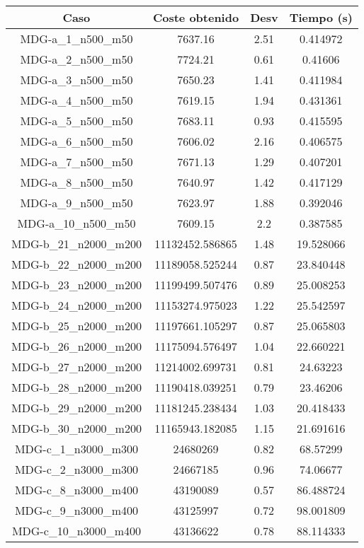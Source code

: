 \documentclass{article}
\begin{document}
\begin{table}[H]
	\centering
	\begin{tabular}{|cccc|}
		\hline
		Caso & Coste obtenido & Desv & Tiempo (s)\\ \hline
		MDG-a\_1\_n500\_m50 & 7637.16 & 2.51 & 0.414972\\
		MDG-a\_2\_n500\_m50 & 7724.21 & 0.61 & 0.41606\\
		MDG-a\_3\_n500\_m50 & 7650.23 & 1.41 & 0.411984\\
		MDG-a\_4\_n500\_m50 & 7619.15 & 1.94 & 0.431361\\
		MDG-a\_5\_n500\_m50 & 7683.11 & 0.93 & 0.415595\\
		MDG-a\_6\_n500\_m50 & 7606.02 & 2.16 & 0.406575\\
		MDG-a\_7\_n500\_m50 & 7671.13 & 1.29 & 0.407201\\
		MDG-a\_8\_n500\_m50 & 7640.97 & 1.42 & 0.417129\\
		MDG-a\_9\_n500\_m50 & 7623.97 & 1.88 & 0.392046\\
		MDG-a\_10\_n500\_m50 & 7609.15 & 2.2 & 0.387585\\
		MDG-b\_21\_n2000\_m200 & 11132452.586865 & 1.48 & 19.528066\\
		MDG-b\_22\_n2000\_m200 & 11189058.525244 & 0.87 & 23.840448\\
		MDG-b\_23\_n2000\_m200 & 11199499.507476 & 0.89 & 25.008253\\
		MDG-b\_24\_n2000\_m200 & 11153274.975023 & 1.22 & 25.542597\\
		MDG-b\_25\_n2000\_m200 & 11197661.105297 & 0.87 & 25.065803\\
		MDG-b\_26\_n2000\_m200 & 11175094.576497 & 1.04 & 22.660221\\
		MDG-b\_27\_n2000\_m200 & 11214002.699731 & 0.81 & 24.63223\\
		MDG-b\_28\_n2000\_m200 & 11190418.039251 & 0.79 & 23.46206\\
		MDG-b\_29\_n2000\_m200 & 11181245.238434 & 1.03 & 20.418433\\
		MDG-b\_30\_n2000\_m200 & 11165943.182085 & 1.15 & 21.691616\\
		MDG-c\_1\_n3000\_m300 & 24680269 & 0.82 & 68.57299\\
		MDG-c\_2\_n3000\_m300 & 24667185 & 0.96 & 74.06677\\
		MDG-c\_8\_n3000\_m400 & 43190089 & 0.57 & 86.488724\\
		MDG-c\_9\_n3000\_m400 & 43125997 & 0.72 & 98.001809\\
		MDG-c\_10\_n3000\_m400 & 43136622 & 0.78 & 88.114333\\

\end{tabular}
\end{table}
\end{document}
